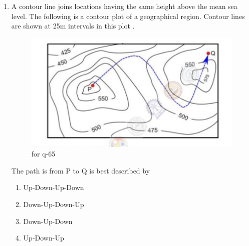 \documentclass[journal,12pt,onecolumn]{IEEEtran}
\theoremstyle{remark}
\begin{document}
\begin{enumerate}
\item A contour line joins locations having the same height above the mean sea level. The following is a contour plot of a geographical region. Contour lines are shown at 25m intervals  in this plot .
\begin{figure}[H]
    \centering
    \includegraphics[width=0.5\columnwidth]{figs/22.png}
    \caption{\centering for q-65}
    \label{fig:placeholder_22}
\end{figure}
The path is from P to Q is best described by 
\begin{multicols}{2}
    \begin{enumerate}
        \item Up-Down-Up-Down
        \item Down-Up-Down-Up
        \item Down-Up-Down
        \item Up-Down-Up
    \end{enumerate}
\end{multicols}
\hfill {}

\end{enumerate}
\end{document}
